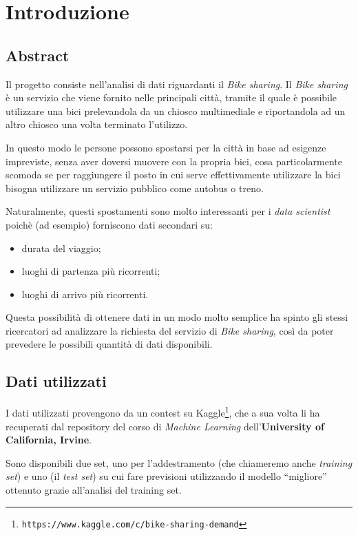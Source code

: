 \section{Introduzione}

\subsection{Abstract}
Il progetto consiste nell'analisi di dati riguardanti il \emph{Bike sharing}.
Il \emph{Bike sharing} è un servizio che viene fornito nelle principali città,
tramite il quale è possibile utilizzare una bici prelevandola da un chiosco
multimediale e riportandola ad un altro chiosco una volta terminato l'utilizzo.

In questo modo le persone possono spostarsi per la città in base ad esigenze
impreviste, senza aver doversi muovere con la propria bici, cosa
particolarmente scomoda se per raggiungere il posto in cui serve
effettivamente utilizzare la bici bisogna utilizzare un servizio pubblico come
autobus o treno.

Naturalmente, questi spostamenti sono molto interessanti per i \emph{data
scientist} poichè (ad esempio) forniscono dati secondari su:

\begin{itemize}
\item durata del viaggio;
\item luoghi di partenza più ricorrenti;
\item luoghi di arrivo più ricorrenti.
\end{itemize}

Questa possibilità di ottenere dati in un modo molto semplice ha spinto gli
stessi ricercatori ad analizzare la richiesta del servizio di \emph{Bike
sharing}, così da poter prevedere le possibili quantità di dati disponibili.

\subsection{Dati utilizzati}\label{sec:intro-dati}

I dati utilizzati provengono da un contest su
Kaggle\footnote{\texttt{https://www.kaggle.com/c/bike-sharing-demand}},
che a sua volta li ha recuperati dal repository del corso di
\emph{Machine Learning} dell'\textbf{University of California, Irvine}.

Sono disponibili due set, uno per l'addestramento (che chiameremo anche
\emph{training set}) e uno (il \emph{test set}) su cui fare previsioni
utilizzando il modello ``migliore'' ottenuto grazie all'analisi del training
set.

